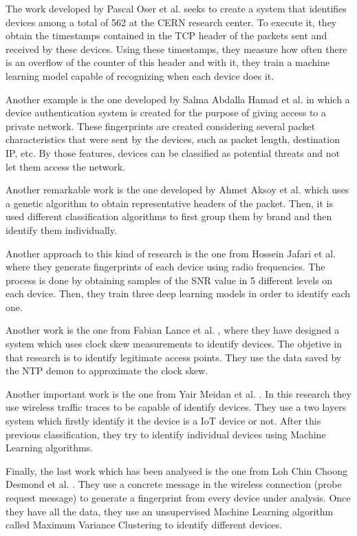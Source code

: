 The work developed by Pascal Oser et al. \cite{oser2018identifying} seeks to create a system that identifies devices among a total of 562 at the CERN research center. To execute it, they obtain the timestamps contained in the TCP header of the packets sent and received by these devices. Using these timestamps, they measure how often there is an overflow of the counter of this header and with it, they train a machine learning model capable of recognizing when each device does it.


Another example is the one developed by Salma Abdalla Hamad et al. \cite{hamad2019iot} in which a device authentication system is created for the purpose of giving access to a private network. These fingerprints are created considering several packet characteristics that were sent by the devices, such as packet length, destination IP, etc. By those features, devices can be classified as potential threats and not let them access the network. 

Another remarkable work is the one developed by Ahmet Aksoy et al. \cite{aksoy2019automated} which uses a genetic algorithm to obtain representative headers of the packet. Then, it is used different classification algorithms to first group them by brand and then identify them individually. 

Another approach to this kind of research is the one from Hossein Jafari et al. \cite{jafari2018iot} where they generate fingerprints of each device using radio frequencies. The process is done by obtaining samples of the SNR value in 5 different levels on each device. Then, they train three deep learning models in order to identify each one.

Another work is the one from Fabian Lance et al. \cite{lanze2012clock}, where they have designed a system which uses clock skew measurements to identify devices. The objetive in that research is to identify legitimate access points. They use the data saved by the NTP demon to approximate the clock skew.

Another important work is the one from Yair Meidan et al. \cite{meidan2017profiliot}. In this research they use wireless traffic traces to be capable of identify devices. They use a two layers system which firstly identify it the device is a IoT device or not. After this previous classification, they try to identify individual devices using Machine Learning algorithms.

Finally, the last work which has been analysed is the one from Loh Chin Choong Desmond et al. \cite{desmond2008identifying}. They use a concrete message in the wireless connection (probe request message) to generate a fingerprint from every device under analysis. Once they have all the data, they use an unsupervised Machine Learning algorithm called Maximum Variance Clustering to identify different devices.


